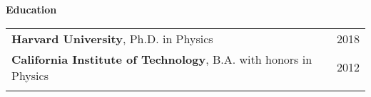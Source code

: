 \documentclass[letterpaper,11pt,oneside]{article}
\newcommand{\crimson}[1]{\textcolor[rgb]{0.67, 0.11, 0.188}{#1}}
\begin{document}
 \vspace{0.1cm}
\raggedright
\normalsize
\begin{flushleft}
 \textbf{\Large{\crimson{E}ducation}} \sout{\hfill} \\
\vspace{0.5cm}
\begin{tabular}{@{} l l }
     \textbf{Harvard University}, Ph.D. in Physics & 2018\\
     \textbf{California Institute of Technology}, B.A. with honors in  Physics & 2012 \\
     \hspace{0.85\linewidth} & \hspace{0.2\linewidth} \\
\end{tabular}
\end{flushleft}




\clearpage
\end{document}
